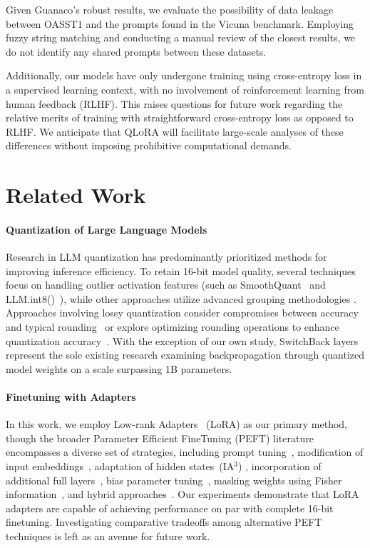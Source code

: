 Given {Guanaco}'s robust results, we evaluate the possibility of data leakage between OASST1 and the prompts found in the Vicuna benchmark. Employing fuzzy string matching and conducting a manual review of the closest results, we do not identify any shared prompts between these datasets.

Additionally, our models have only undergone training using cross-entropy loss in a supervised learning context, with no involvement of reinforcement learning from human feedback (RLHF). This raises questions for future work regarding the relative merits of training with straightforward cross-entropy loss as opposed to RLHF. We anticipate that \textsc{QLoRA} will facilitate large-scale analyses of these differences without imposing prohibitive computational demands.

\section{Related Work}

\paragraph{Quantization of Large Language Models} Research in LLM quantization has predominantly prioritized methods for improving inference efficiency. To retain 16-bit model quality, several techniques focus on handling outlier activation features (such as SmoothQuant~\citep{xiao2022smoothquant} and LLM.int8()~\citep{dettmers2022llm}), while other approaches utilize advanced grouping methodologies \citep{park2022nuqmm, yao2022zeroquant}. Approaches involving lossy quantization consider compromises between accuracy and typical rounding~\citep{dettmers2022case,zeng2022glm,pope2022efficiently} or explore optimizing rounding operations to enhance quantization accuracy~\citep{frantar2022gptq}. With the exception of our own study, SwitchBack layers~\citep{wortsman2023stable} represent the sole existing research examining backpropagation through quantized model weights on a scale surpassing 1B parameters.

\paragraph{Finetuning with Adapters} In this work, we employ Low-rank Adapters~\citep{hu2021lora} (LoRA) as our primary method, though the broader Parameter Efficient FineTuning (PEFT) literature encompasses a diverse set of strategies, including prompt tuning~\citep{qin2021learning,lester2021power,li2021prefix}, modification of input embeddings~\citep{an2022input}, adaptation of hidden states~(IA$^3$) \citep{liu2022few}, incorporation of additional full layers~\citep{houlsby2019parameter}, bias parameter tuning~\citep{zaken2021bitfit}, masking weights using Fisher information~\citep{sung2021training}, and hybrid approaches~\citep{henderson2021compacter}. Our experiments demonstrate that LoRA adapters are capable of achieving performance on par with complete 16-bit finetuning. Investigating comparative tradeoffs among alternative PEFT techniques is left as an avenue for future work.

